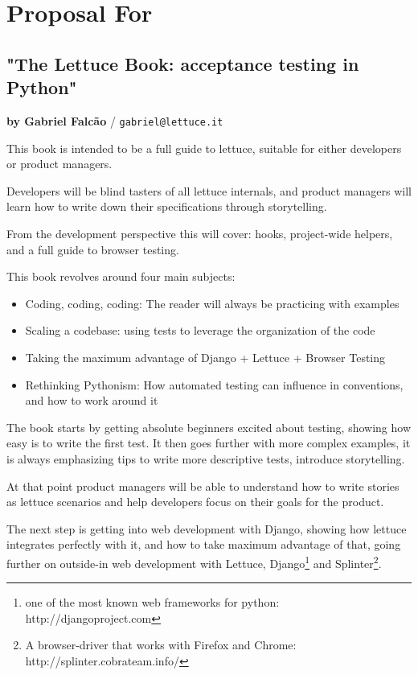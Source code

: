 \documentclass[letterpaper]{article}
\begin{document}
\section*{Proposal For}

\subsection*{"The Lettuce Book: acceptance testing in Python"}
\normalsize\textbf{by Gabriel Falcão} \large{/} \texttt{gabriel@lettuce.it}

\normalsize

This book is intended to be a full guide to lettuce, suitable for
either developers or product managers.

Developers will be blind tasters of all lettuce internals, and product
managers will learn how to write down their specifications through
storytelling.

\noindent
From the development perspective this will cover: hooks, project-wide
helpers, and a full guide to browser testing.

\noindent
This book revolves around four main subjects:

\begin{itemize}

\item{Coding, coding, coding: The reader will always be practicing with examples}

\item{Scaling a codebase: using tests to leverage the organization of the code}

\item{Taking the maximum advantage of Django + Lettuce + Browser Testing}

\item{Rethinking Pythonism: How automated testing can influence in conventions, and how to work around it}
\end{itemize}


The book starts by getting absolute beginners excited about testing, showing how easy is to write the first test.
It then goes further with more complex examples, it is always emphasizing
tips to write more descriptive tests, introduce storytelling.

At that point product managers will be able to understand how to write
stories as lettuce scenarios and help developers focus on their
goals for the product.

\noindent
The next step is getting into web development with Django, showing how
lettuce integrates perfectly with it, and how to take maximum
advantage of that, going further on outside-in web development with
Lettuce, Django\footnote{one of the most known web frameworks for python: http://djangoproject.com} and Splinter\footnote{A browser-driver that works with Firefox and Chrome: http://splinter.cobrateam.info/}.
\end{document}
